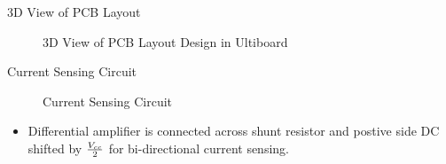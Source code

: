 \begin{frame}{3D View of PCB Layout}
	\begin{figure}
		\centering


		\caption{3D View of PCB Layout Design in Ultiboard}

	\end{figure}
\end{frame}



\begin{frame}{Current Sensing Circuit}
	\begin{figure}
		\centering


		\caption{Current Sensing Circuit}
	\end{figure}


	\begin{itemize}
		\item Differential amplifier is connected across shunt resistor and postive side DC shifted by $V_{cc}\over 2$ for bi-directional current sensing.
	\end{itemize}
\end{frame}

